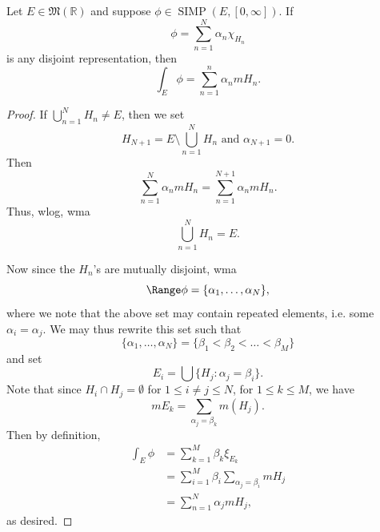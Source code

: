 \documentclass[notoc,notitlepage]{tufte-book}
\DeclareMathOperator{\SIMP}{SIMP}
\begin{document}
\begin{lemma}\label{lemma:integral_of_a_simple_funciton_using_its_disjoint_representation}
  Let $E \in \mathfrak{M}(\mathbb{R})$ and suppose $\phi \in \SIMP(E, [0,
  \infty])$. If
  \begin{equation*}
    \phi = \sum_{n=1}^{N} \alpha_n \chi_{H_n}
  \end{equation*}
  is any disjoint representation, then
  \begin{equation*}
    \int_{E} \phi = \sum_{n=1}^{n} \alpha_n mH_n.
  \end{equation*}
\end{lemma}

\begin{proof}
   If
  $\bigcup_{n=1}^{N} H_n \neq E$, then we set
  \begin{equation*}
    H_{N + 1} = E \setminus \bigcup_{n=1}^{N} H_n \text{ and } \alpha_{N+1} = 0.
  \end{equation*}
  Then
  \begin{equation*}
    \sum_{n=1}^{N} \alpha_n mH_n = \sum_{n=1}^{N+1} \alpha_n mH_n.
  \end{equation*}
  Thus, wlog, wma
  \begin{equation*}
    \bigcup_{n=1}^{N} H_n = E.
  \end{equation*}

  Now since the $H_n$'s are mutually disjoint, wma
  \begin{equation*}
    \Range \phi = \{ \alpha_1, \ldots, \alpha_N \},
  \end{equation*}
  where we note that the above set may contain repeated elements, i.e. some
  $\alpha_i = \alpha_j$. We may thus rewrite this set such that
  \begin{equation*}
    \{ \alpha_1, \ldots, \alpha_N \} = \{ \beta_1 < \beta_2 < \hdots < \beta_M
    \}
  \end{equation*}
  and set
  \begin{equation*}
    E_i = \bigcup \{ H_j : \alpha_j = \beta_i \}.
  \end{equation*}
  Note that since $H_i \cap H_j = \emptyset$ for $1 \leq i \neq j \leq N$, for
  $1 \leq k \leq M$, we have 
  \begin{equation*}
    m E_k = \sum_{\alpha_j = \beta_k} m(H_j).
  \end{equation*}
  Then by definition,
  \begin{align*}
    \int_{E} \phi
    &= \sum_{k=1}^{M} \beta_k \xi_{E_k} \\
    &= \sum_{i=1}^{M} \beta_i \sum_{\alpha_j = \beta_i} mH_j \\
    &= \sum_{n=1}^{N} \alpha_j mH_j,
  \end{align*}
  as desired.
\end{proof}
\end{document}
